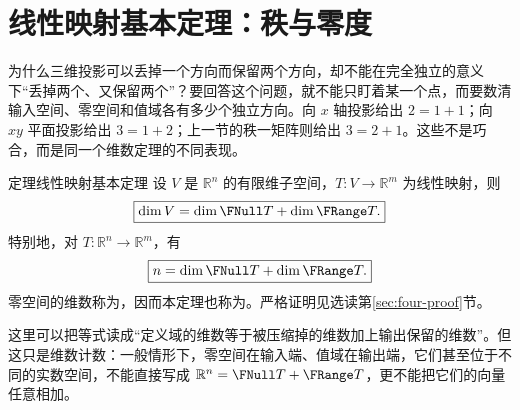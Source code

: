 \documentclass[a4paper,12pt,twoside,openany,fontset=none]{ctexbook}
\newcounter{theorem}[chapter]
\newenvironment{theorem}[1][]{\begin{thmBox}{定理}{#1}}{\end{thmBox}}
\numberwithin{equation}{chapter}
\begin{document}
\section{线性映射基本定理：秩与零度}
\label{sec:four-rank-nullity}

为什么三维投影可以丢掉一个方向而保留两个方向，却不能在完全独立的意义下“丢掉两个、又保留两个”？要回答这个问题，就不能只盯着某一个点，而要数清输入空间、零空间和值域各有多少个独立方向。向 $x$ 轴投影给出 $2=1+1$；向 $xy$ 平面投影给出 $3=1+2$；上一节的秩一矩阵则给出 $3=2+1$。这些不是巧合，而是同一个维数定理的不同表现。

\begin{theorem}[线性映射基本定理]
设 $V$ 是 $\mathbb R^n$ 的有限维子空间，$T:V\to\mathbb R^m$ 为线性映射，则
\[
 \boxed{\dim V=\dim\FNull T+\dim\FRange T.}
\]
特别地，对 $T:\mathbb R^n\to\mathbb R^m$，有
\[
 \boxed{n=\dim\FNull T+\dim\FRange T.}
\]
零空间的维数称为，因而本定理也称为。严格证明见选读第\ref{sec:four-proof}节。
\end{theorem}

这里可以把等式读成“定义域的维数等于被压缩掉的维数加上输出保留的维数”。但这只是维数计数：一般情形下，零空间在输入端、值域在输出端，它们甚至位于不同的实数空间，不能直接写成 $\mathbb R^n=\FNull T+\FRange T$，更不能把它们的向量任意相加。
\end{document}
